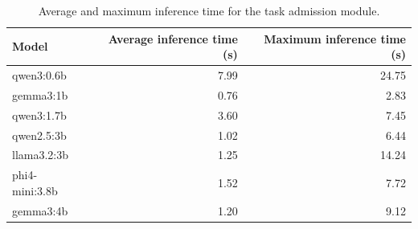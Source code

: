 \begin{table}[t]
\centering
\caption{Average and maximum inference time for the task admission module.}
\label{tab:task_admission_inference_time}
\begin{tabular}{lrr}
\toprule
Model & Average inference time (s) & Maximum inference time (s) \\
\midrule
qwen3:0.6b & 7.99 & 24.75 \\
gemma3:1b & 0.76 & 2.83 \\
qwen3:1.7b & 3.60 & 7.45 \\
qwen2.5:3b & 1.02 & 6.44 \\
llama3.2:3b & 1.25 & 14.24 \\
phi4-mini:3.8b & 1.52 & 7.72 \\
gemma3:4b & 1.20 & 9.12 \\
\bottomrule
\end{tabular}

\end{table}
